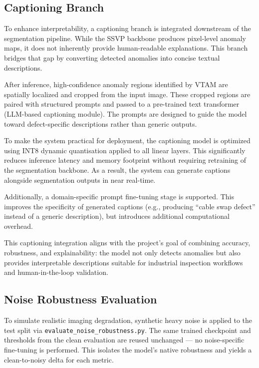 \documentclass[11pt]{article}
\begin{document}
\subsection{Captioning Branch}

To enhance interpretability, a captioning branch is integrated downstream of the segmentation pipeline. While the SSVP backbone produces pixel-level anomaly maps, it does not inherently provide human-readable explanations. This branch bridges that gap by converting detected anomalies into concise textual descriptions.

After inference, high-confidence anomaly regions identified by VTAM are spatially localized and cropped from the input image. These cropped regions are paired with structured prompts and passed to a pre-trained text transformer (LLM-based captioning module). The prompts are designed to guide the model toward defect-specific descriptions rather than generic outputs.

To make the system practical for deployment, the captioning model is optimized using INT8 dynamic quantisation applied to all linear layers. This significantly reduces inference latency and memory footprint without requiring retraining of the segmentation backbone. As a result, the system can generate captions alongside segmentation outputs in near real-time.

Additionally, a domain-specific prompt fine-tuning stage is supported. This improves the specificity of generated captions (e.g., producing “cable swap defect” instead of a generic description), but introduces additional computational overhead. 

This captioning integration aligns with the project’s goal of combining accuracy, robustness, and explainability: the model not only detects anomalies but also provides interpretable descriptions suitable for industrial inspection workflows and human-in-the-loop validation.



\subsection{Noise Robustness Evaluation}

To simulate realistic imaging degradation, synthetic heavy noise is applied to the
test split via \texttt{evaluate\_noise\_robustness.py}. The same trained checkpoint
and thresholds from the clean evaluation are reused unchanged — no noise-specific
fine-tuning is performed. This isolates the model's native robustness and yields a
clean-to-noisy delta for each metric.
\end{document}

